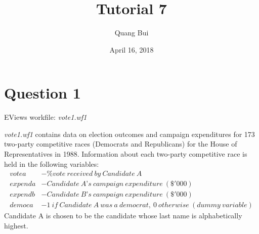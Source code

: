 \documentclass[12pt]{report}
\title{Tutorial 7}
\subtitle
{
	\textbf{keywords}: level log interpretation, dummy variables, hypothesis test, F-test, t-test, p-value, overall significance, individual significance, multiple linear restrictions, reparameterisation
	
	\textbf{estimated reading time}: 35 minutes
}
\author{Quang Bui}
\date{April 16, 2018}
\begin{document}
	
\maketitle

\section*{Question 1}
\noindent EViews workfile: \textit{vote1.wf1}

\noindent \textit{vote1.wf1} contains data on election outcomes and campaign expenditures for 173 two-party competitive races (Democrats and Republicans) for the House of Representatives in 1988. Information about each two-party competitive race is held in the following variables:
\begin{align*}
	votea &- \%vote\ received\ by\ Candidate\ A \\
	expenda &- Candidate\ A’s\ campaign\ expenditure\ (\$'000) \\
	expendb &- Candidate\ B’s\ campaign\ expenditure\ (\$'000) \\
	democa &- 1\ if\ Candidate\ A\ was\ a\ democrat,\ 0\ otherwise\ (dummy\ variable)
\end{align*}
\noindent Candidate A is chosen to be the candidate whose last name is alphabetically highest.
\end{document}
